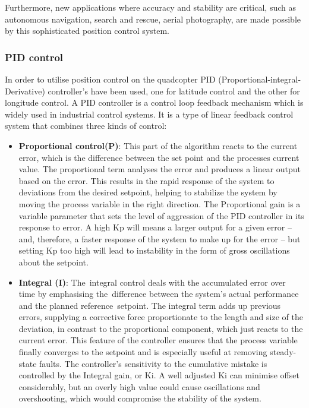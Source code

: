 \documentclass{article}
\begin{document}
Furthermore, new applications where accuracy and stability are critical, such as autonomous navigation, search and rescue, aerial photography, are made possible by this sophisticated position control system.

\subsubsection{PID control}\label{PID_control}
In order to utilise position control on the quadcopter PID (Proportional-integral-Derivative) controller's have been used, one for latitude control and the other for longitude control. A PID controller is a control loop feedback mechanism which is widely used in industrial control systems. It is a type of linear feedback control system that combines three kinds of control:
\begin{itemize}
  \item \textbf{Proportional control(P)}: This part of the algorithm reacts to the current error, which is the difference between the set point and the processes current value. The proportional term analyses the error and produces a linear output based on the error. This results in the rapid 
  response of the system to deviations from the desired setpoint, helping to stabilize the system by moving the process variable in the right direction. The Proportional gain is a variable parameter that sets the level of aggression of the PID controller in its response to error. A high Kp will
  means a larger output for a given error – and, therefore, a faster response of the system to make up for the error – but setting Kp too high will lead to instability in the form of gross oscillations about the setpoint.
  \item \textbf{Integral (I)}: The integral control deals with the accumulated error over time by emphasising the difference between the system's actual performance and the planned reference setpoint. The integral term adds up previous errors, supplying a corrective force proportionate to the length 
  and size of the deviation, in contrast to the proportional component, which just reacts to the current error. This feature of the controller ensures that the process variable finally converges to the setpoint and is especially useful at removing steady-state faults. The controller's sensitivity to the 
  cumulative mistake is controlled by the Integral gain, or Ki. A well adjusted Ki can minimise offset considerably, but an overly high value could cause oscillations and overshooting, which would compromise the stability of the system.

\end{itemize}
\end{document}
